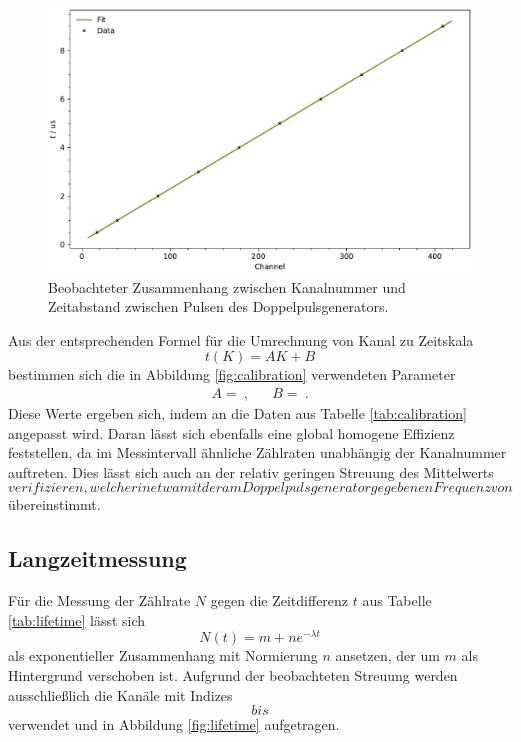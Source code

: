 \begin{figure}[H]
	\vspace{\baselineskip}
	\centering
	\includegraphics[width=\textwidth]{build/calibration.pdf}
	\caption{Beobachteter Zusammenhang zwischen Kanalnummer und Zeitabstand zwischen Pulsen des Doppelpulsgenerators.}
	\label{fig:calibration}
\end{figure}

Aus der entsprechenden Formel für die Umrechnung von Kanal zu Zeitskala
\begin{equation*}
	t(K) = AK + B
\end{equation*}
bestimmen sich die in Abbildung \eqref{fig:calibration} verwendeten Parameter
\begin{align*}
	A =  \: , && B =  \: .
\end{align*}
Diese Werte ergeben sich, indem an die Daten aus Tabelle \eqref{tab:calibration} angepasst wird. Daran lässt sich ebenfalls
eine global homogene Effizienz feststellen, da im Messintervall ähnliche Zählraten unabhängig der Kanalnummer auftreten.
Dies lässt sich auch an der relativ geringen Streuung des Mittelwerts $$ verifizieren, welcher in etwa mit
der am Doppelpulsgenerator gegebenen Frequenz von $$ übereinstimmt.



\subsection{Langzeitmessung}

Für die Messung der Zählrate $N$ gegen die Zeitdifferenz $t$ aus Tabelle \eqref{tab:lifetime} lässt sich
\begin{equation*}
	N(t) = m + ne^{-\lambda t}
\end{equation*}
als exponentieller Zusammenhang mit Normierung $n$ ansetzen, der um $m$ als Hintergrund verschoben ist. Aufgrund der
beobachteten Streuung werden ausschließlich die Kanäle mit Indizes $$ bis $$
verwendet und in Abbildung \eqref{fig:lifetime} aufgetragen.

